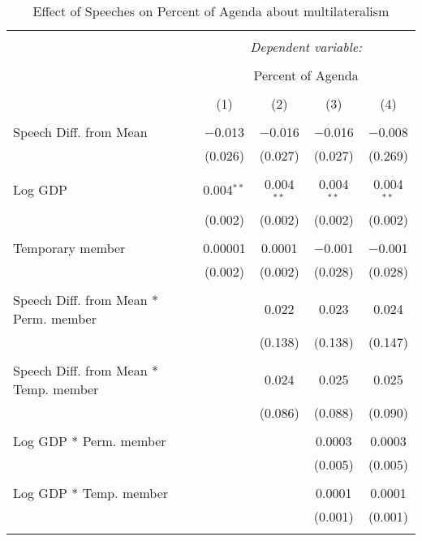 
\begin{table}[!htbp] \centering 
  \caption{Effect of Speeches on Percent of Agenda about multilateralism} 
  \label{} 
\begin{tabular}{@{\extracolsep{5pt}}lcccc} 
\\[-1.8ex]\hline 
\hline \\[-1.8ex] 
 & \multicolumn{4}{c}{\textit{Dependent variable:}} \\ 
\cline{2-5} 
\\[-1.8ex] & \multicolumn{4}{c}{Percent of Agenda} \\ 
\\[-1.8ex] & (1) & (2) & (3) & (4)\\ 
\hline \\[-1.8ex] 
 Speech Diff. from Mean & $-$0.013 & $-$0.016 & $-$0.016 & $-$0.008 \\ 
  & (0.026) & (0.027) & (0.027) & (0.269) \\ 
  & & & & \\ 
 Log GDP & 0.004$^{**}$ & 0.004$^{**}$ & 0.004$^{**}$ & 0.004$^{**}$ \\ 
  & (0.002) & (0.002) & (0.002) & (0.002) \\ 
  & & & & \\ 
 Temporary member & 0.00001 & 0.0001 & $-$0.001 & $-$0.001 \\ 
  & (0.002) & (0.002) & (0.028) & (0.028) \\ 
  & & & & \\ 
 Speech Diff. from Mean * Perm. member &  & 0.022 & 0.023 & 0.024 \\ 
  &  & (0.138) & (0.138) & (0.147) \\ 
  & & & & \\ 
 Speech Diff. from Mean * Temp. member &  & 0.024 & 0.025 & 0.025 \\ 
  &  & (0.086) & (0.088) & (0.090) \\ 
  & & & & \\ 
 Log GDP * Perm. member &  &  & 0.0003 & 0.0003 \\ 
  &  &  & (0.005) & (0.005) \\ 
  & & & & \\ 
 Log GDP * Temp. member &  &  & 0.0001 & 0.0001 \\ 
  &  &  & (0.001) & (0.001) \\ 
  & & & & \\ 

\end{tabular}
\end{table}
